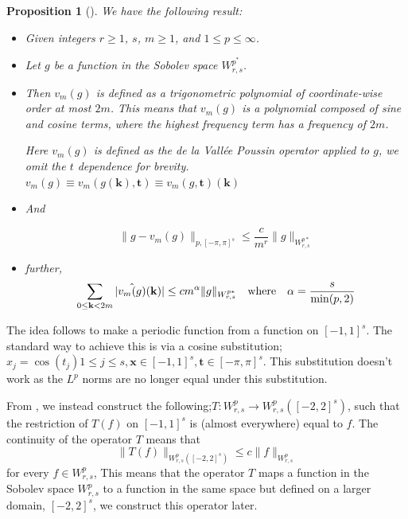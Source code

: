 \documentclass[11pt,a4paper]{article}
\theoremstyle{plain}
\newtheorem{proposition}[theorem]{Proposition}
\theoremstyle{definition}
\theoremstyle{remark}
\begin{document}
\begin{proposition}[\cite{prop3.1 Mhaskar}]
\label{prop31}
We have the following result:
\begin{itemize}
    \item  Given integers \( r \geq 1 \), \( s \), \( m \geq 1 \), and \( 1 \leq p \leq \infty \).
    \item  Let \( g \) be a function in the Sobolev space \( W^{p^{\ast}}_{r,s} \).
    
    \item Then \( v_m(g) \) is defined as a trigonometric polynomial of coordinate-wise order at most \( 2m \). This means that \( v_m(g) \) is a polynomial composed of sine and cosine terms, where the highest frequency term has a frequency of \( 2m \).
    
    Here \( v_m(g) \) is defined as the de la Vallée Poussin operator applied to \( g \), we omit the \(t\) dependence for brevity. \(v_{m}(g) \equiv v_{m}(g(\mathbf{k} ), \mathbf{t} )\equiv v_{m}(g,\mathbf{t} )(\mathbf{k} )\) 
    \item And 

    \begin{equation}
        \|g - v_m(g)\|_{p, [-\pi, \pi]^s} \leq \frac{c}{m^r} \|g\|_{W^{p*}_{r,s}}
        \label{keyInequality}
    \end{equation}
    \item further,
    \begin{equation}
        \sum_{0 \leq \mathbf{k} < 2m} |\Hat{v_m(g)}(\mathbf{k})| \leq cm^\alpha \|g\|_{W^{p*}_{r,s}}  \quad \text{where} \quad \alpha = \frac{s}{\min(p,2)} 
    \end{equation}
\end{itemize}
\end{proposition}

The idea follows to make a periodic function from a function on \([-1,1]^s\). The standard way to achieve this is via a cosine substitution; \(x_{j} = \cos (t_{j}) 1 \leq j \leq s, \mathbf{x} \in [-1,1]^s, \mathbf{t} \in [-\pi ,\pi ]^s\). This substitution doesn't work as the \(L^p\) norms are no longer equal under this substitution.

From \cite{Stein 1970}, we instead construct the following;\(T: W_{r,s}^{p} \to W_{r,s}^{p}([-2,2]^s) \), such that the restriction of \( T(f) \) on \( [-1,1]^s \) is (almost everywhere) equal to \( f \). The continuity of the operator \( T \) means that
\[
    \|T(f)\|_{W_{r,s}^{p}([-2,2]^s)} \leq c \|f\|_{W_{r,s}^{p}}  
\]
for every \(f \in W_{r,s}^{p}\), This means that the operator \( T \) maps a function in the Sobolev space \( W_{r,s}^{p} \) to a function in the same space but defined on a larger domain, \( [-2, 2]^s \), we construct this operator later.
\end{document}
